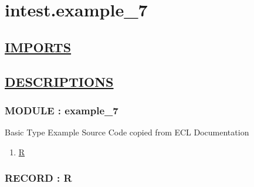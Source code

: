 \chapter*{intest.example\_7}

\section*{\underline{IMPORTS}}

\section*{\underline{DESCRIPTIONS}}
\subsection*{MODULE : example\_7}
\hypertarget{ecldoc:intest.example_7_intest.example_7}{}
Basic Type Example Source Code copied from ECL Documentation \\
\begin{enumerate}
\item \hyperlink{ecldoc:intest.example_7_intest.example_7.r}{R}
\end{enumerate}
\subsection*{RECORD : R}
\hypertarget{ecldoc:intest.example_7_intest.example_7.r}{}

